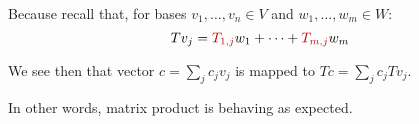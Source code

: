 Because recall that, for bases $v_1,\dots,v_n \in V$ and $w_1,\dots,w_m\in W$:
%
\[
Tv_j = {\color{red}T_{1,j}} w_1 + \cdots + {\color{red}T_{m,j}} w_m
\]

{
We see then that vector $c=\sum_j c_j v_j$ is mapped to $Tc = \sum_j c_j Tv_j$.

In other words, matrix product is behaving as expected.
}







